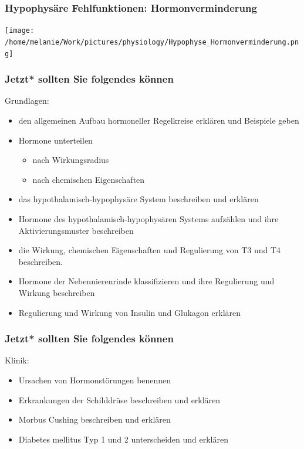 \documentclass{beamer}
\begin{document}
\begin{frame}
\frametitle{Hypophysäre Fehlfunktionen: Hormonverminderung}

\begin{center}
\texttt{[image: /home/melanie/Work/pictures/physiology/Hypophyse\_Hormonverminderung.png]}
\end{center}

\end{frame}



\begin{frame}

\frametitle{Jetzt* sollten Sie folgendes können}



\begin{block}{Grundlagen:}
\begin{itemize}
\item
den allgemeinen Aufbau hormoneller Regelkreise erklären und Beispiele geben
\item
Hormone unterteilen 
\begin{itemize}
\item
 nach Wirkungsradius
\item 
nach chemischen Eigenschaften
\end{itemize}
\item
das hypothalamisch-hypophysäre System beschreiben und erklären
\item
Hormone des hypothalamisch-hypophysären Systems aufzählen und ihre Aktivierungsmuster beschreiben
\item
die Wirkung, chemischen Eigenschaften und Regulierung von T3 und T4 beschreiben.
\item
Hormone der Nebennierenrinde klassifizieren und ihre Regulierung und Wirkung beschreiben 
\item
Regulierung und Wirkung von Insulin und Glukagon erklären

\end{itemize}

\end{block}


\end{frame}



\begin{frame}

\frametitle{Jetzt* sollten Sie folgendes können}


\begin{block}{Klinik:}
\begin{itemize}
\item
Ursachen von Hormonstörungen benennen
\item
 Erkrankungen der Schilddrüse beschreiben und erklären
\item
 Morbus Cushing beschreiben und erklären
\item
Diabetes mellitus Typ 1 und 2 unterscheiden und erklären 
\end{itemize}

\end{block}

\end{frame}
\end{document}
